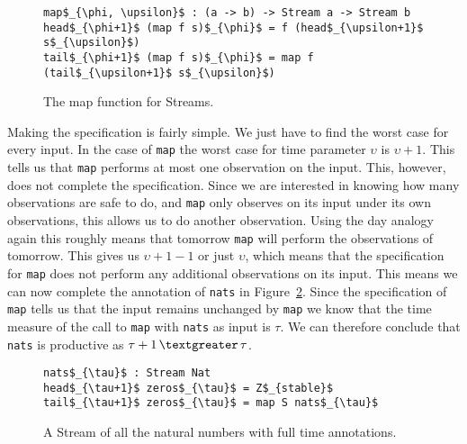 \begin{figure}
\begin{Verbatim}[commandchars=\\\{\},codes={\catcode`$=3\catcode`_=8}]
map$_{\phi, \upsilon}$ : (a -> b) -> Stream a -> Stream b
head$_{\phi+1}$ (map f s)$_{\phi}$ = f (head$_{\upsilon+1}$ s$_{\upsilon}$)
tail$_{\phi+1}$ (map f s)$_{\phi}$ = map f (tail$_{\upsilon+1}$ s$_{\upsilon}$)
\end{Verbatim}
\caption{The map function for Streams.}
\label{fig:map}
\end{figure}

Making the specification is fairly simple. We just have to find the worst case for every input. In the case of \texttt{map} the worst case for time parameter $\upsilon$ is $\upsilon+1$. This tells us that \texttt{map} performs at most one observation on the input. This, however, does not complete the specification. Since we are interested in knowing how many observations are safe to do, and \texttt{map} only observes on its input under its own observations, this allows us to do another observation. Using the day analogy again this roughly means that tomorrow \texttt{map} will perform the observations of tomorrow. This gives us $\upsilon+1-1$ or just $\upsilon$, which means that the specification for \texttt{map} does not perform any additional observations on its input. This means we can now complete the annotation of \texttt{nats} in Figure~\ref{fig:natsComplete}. Since the specification of \texttt{map} tells us that the input remains unchanged by \texttt{map} we know that the time measure of the call to \texttt{map} with \texttt{nats} as input is $\tau$. We can therefore conclude that \texttt{nats} is productive as $\tau+1\,\textgreater\,\tau$.

\begin{figure}
\begin{Verbatim}[commandchars=\\\{\},codes={\catcode`$=3\catcode`_=8}]
nats$_{\tau}$ : Stream Nat
head$_{\tau+1}$ zeros$_{\tau}$ = Z$_{stable}$
tail$_{\tau+1}$ zeros$_{\tau}$ = map S nats$_{\tau}$
\end{Verbatim}
\caption{A Stream of all the natural numbers with full time annotations.}
\label{fig:natsComplete}
\end{figure}

